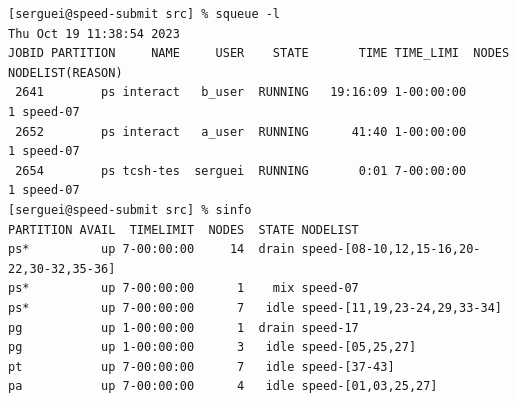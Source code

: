 \small
\begin{verbatim}
[serguei@speed-submit src] % squeue -l
Thu Oct 19 11:38:54 2023
JOBID PARTITION     NAME     USER    STATE       TIME TIME_LIMI  NODES NODELIST(REASON)
 2641        ps interact   b_user  RUNNING   19:16:09 1-00:00:00      1 speed-07
 2652        ps interact   a_user  RUNNING      41:40 1-00:00:00      1 speed-07
 2654        ps tcsh-tes  serguei  RUNNING       0:01 7-00:00:00      1 speed-07
[serguei@speed-submit src] % sinfo
PARTITION AVAIL  TIMELIMIT  NODES  STATE NODELIST
ps*          up 7-00:00:00     14  drain speed-[08-10,12,15-16,20-22,30-32,35-36]
ps*          up 7-00:00:00      1    mix speed-07
ps*          up 7-00:00:00      7   idle speed-[11,19,23-24,29,33-34]
pg           up 1-00:00:00      1  drain speed-17
pg           up 1-00:00:00      3   idle speed-[05,25,27]
pt           up 7-00:00:00      7   idle speed-[37-43]
pa           up 7-00:00:00      4   idle speed-[01,03,25,27]
\end{verbatim}
\normalsize


